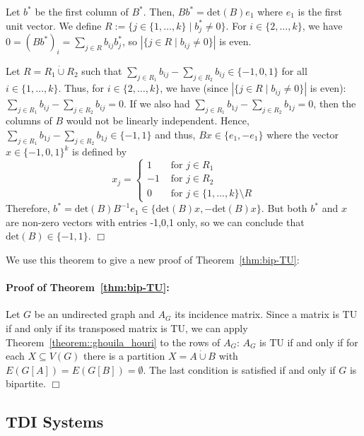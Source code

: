 \documentclass[12pt, showidx, twoside]{article}
\def\endproof{\hfill{$\Box$}}
\begin{document}
{{Let $b^*$ be the first column of $B^*$. Then, $B b^* = \text{det}(B) e_1$ where
$e_1$ is the first unit vector. 
We define $R:= \{ j \in \{1, \dots, k\} \mid b^*_j \neq 0 \}$.
For $i \in \{2,\dots,k\}$, we have $0 = (B b^*)_i = \sum_{j \in R} b_{ij} b^*_j$,
so $|\{ j \in R \mid b_{ij} \neq 0 \}|$ is even.

Let $R = R_1 \dot\cup R_2$ such that 
$\sum_{j \in R_1} b_{ij} - \sum_{j \in R_2} b_{ij} \in \{-1,0,1\}$ for all $i \in \{1,\dots,k\}$.
Thus, for $i \in \{2,\dots,k\}$, we have (since $|\{ j \in R \mid b_{ij} \neq 0 \}|$ is even):
$\sum_{j \in R_1} b_{ij} - \sum_{j \in R_2} b_{ij} = 0$. If we also had
$\sum_{j \in R_1} b_{1j} - \sum_{j \in R_2} b_{1j} = 0$, then the columns of $B$ would
not be linearly independent. 
Hence, $\sum_{j \in R_1} b_{1j} - \sum_{j \in R_2} b_{1j} \in \{-1,1\}$ and
thus, $B x \in \{e_1,-e_1\}$ where the vector $x \in \{-1,0,1\}^k$ is defined
by
\[
   x_j = \left\{\begin{array}{ll}
           1  & \text{ for } j \in R_1\\
           -1 & \text{ for } j \in R_2\\
           0  & \text{ for } j \in \{1,\dots,k\}\setminus R
         \end{array}
         \right.
\]
Therefore, $b^* = \text{det}(B) B^{-1}e_1 \in \{\text{det}(B)x, -\text{det}(B)x\}$.
But both $b^*$ and $x$ are non-zero vectors with entries -1,0,1 only,
so we can conclude that $\text{det}(B) \in \{-1,1\}$.
\endproof

We use this theorem to give a new proof of Theorem~\ref{thm:bip-TU}:
\paragraph{Proof of Theorem~\ref{thm:bip-TU}:}
Let $G$ be an undirected graph and $A_G$ its incidence matrix.
Since a matrix is TU if and only if its transposed matrix
is TU, we can apply Theorem~\ref{theorem::ghouila_houri} to the rows of $A_G$:
$A_G$ is TU if and only if for each $X \subseteq V(G)$ there is a partition 
$X = A \dot\cup B$ with $E(G[A]) = E(G[B]) = \emptyset$. The last condition
is satisfied if and only if $G$ is bipartite.
\endproof



\subsection{TDI Systems}

}}
\end{document}
